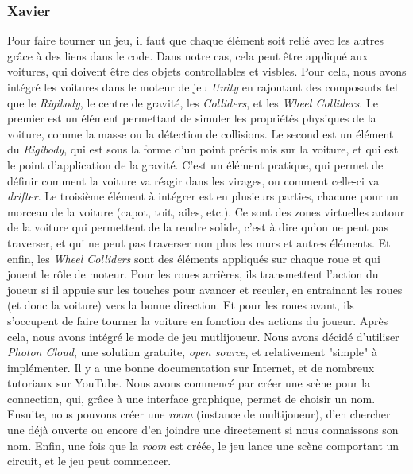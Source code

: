 \documentclass[a4paper,12pt]{article}
\begin{document}
    \subsubsection{Xavier}
        Pour faire tourner un jeu, il faut que chaque élément soit relié avec
        les autres grâce à des liens dans le code. Dans notre cas, cela peut être
        appliqué aux voitures, qui doivent être des objets controllables et visbles.
        Pour cela, nous avons intégré les voitures dans le moteur de jeu \textsl{Unity}
        en rajoutant des composants tel que le \textit{Rigibody}, le centre de gravité,
        les \textit{Colliders}, et les \textit{Wheel Colliders}. Le premier est un élément
        permettant de simuler les propriétés physiques de la voiture, comme la masse ou la
        détection de collisions. Le second est un élément du \textit{Rigibody}, qui est sous
        la forme d'un point précis mis sur la voiture, et qui est le point d'application
        de la gravité. C'est un élément pratique, qui permet de définir comment la
        voiture va réagir dans les virages, ou comment celle-ci va \textit{drifter}.
        Le troisième élément à intégrer est en plusieurs parties, chacune pour un morceau
        de la voiture (capot, toit, ailes, etc.). Ce sont des zones virtuelles autour
        de la voiture qui permettent de la rendre solide, c'est à dire qu'on ne peut pas
        traverser, et qui ne peut pas traverser non plus les murs et autres éléments.
        Et enfin, les \textit{Wheel Colliders} sont des éléments appliqués sur chaque roue
        et qui jouent le rôle de moteur. Pour les roues arrières, ils transmettent l'action
        du joueur si il appuie sur les touches pour avancer et reculer, en entrainant les
        roues (et donc la voiture) vers la bonne direction. Et pour les roues avant,
        ils s'occupent de faire tourner la voiture en fonction des actions du joueur.
        Après cela, nous avons intégré le mode de jeu mutlijoueur. Nous avons décidé
        d'utiliser \textsl{Photon Cloud}, une solution gratuite, \textit{open source},
        et relativement "simple" à implémenter. Il y a une bonne documentation sur
        Internet, et de nombreux tutoriaux sur YouTube. Nous avons commencé par
        créer une scène pour la connection, qui, grâce à une interface graphique,
        permet de choisir un nom. Ensuite, nous pouvons créer une \textit{room}
        (instance de multijoueur), d'en chercher une déjà ouverte ou encore
        d'en joindre une directement si nous connaissons son nom. Enfin, une
        fois que la \textit{room} est créée, le jeu lance une scène comportant
        un circuit, et le jeu peut commencer.
\clearpage
\end{document}
